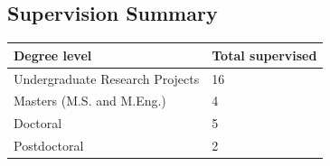 \subsection*{Supervision Summary}
\begin{longtable}{|p{} p{}|}
\hline
\textbf{Degree level} & \textbf{Total supervised} \\ \hline\hline 
Undergraduate Research Projects &  16 \\ 
Masters (M.S. and M.Eng.) &  4\\
Doctoral &  5\\
Postdoctoral &  2\\
\hline
 \end{longtable}
